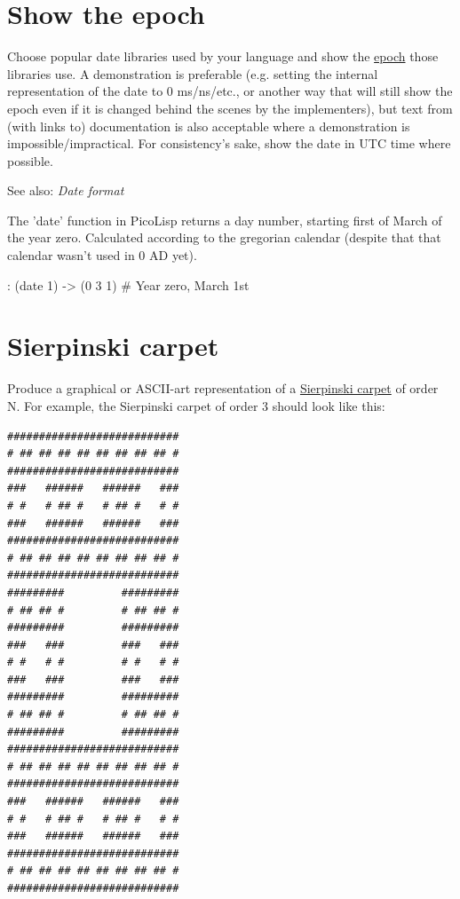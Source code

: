 \pagebreak{}
\section*{Show the epoch}

Choose popular date libraries used by your language and show the
\href{http://en.wikipedia.org/wiki/Epoch\_(reference\_date)\#Computing}{epoch}
those libraries use. A demonstration is preferable (e.g. setting the
internal representation of the date to 0 ms/ns/etc., or another way that
will still show the epoch even if it is changed behind the scenes by the
implementers), but text from (with links to) documentation is also
acceptable where a demonstration is impossible/impractical. For
consistency's sake, show the date in UTC time where possible.

See also: \emph{Date format}


\begin{wideverbatim}

The 'date' function in PicoLisp returns a day number, starting first of March of
the year zero. Calculated according to the gregorian calendar (despite that that
calendar wasn't used in 0 AD yet).

: (date 1)
-> (0 3 1)  # Year zero, March 1st

\end{wideverbatim}

\pagebreak{}
\section*{Sierpinski carpet}

Produce a graphical or ASCII-art representation of a
\href{http://en.wikipedia.org/wiki/Sierpinski\_carpet}{Sierpinski
carpet} of order N. For example, the Sierpinski carpet of order 3 should
look like this:

\begin{verbatim}
###########################
# ## ## ## ## ## ## ## ## #
###########################
###   ######   ######   ###
# #   # ## #   # ## #   # #
###   ######   ######   ###
###########################
# ## ## ## ## ## ## ## ## #
###########################
#########         #########
# ## ## #         # ## ## #
#########         #########
###   ###         ###   ###
# #   # #         # #   # #
###   ###         ###   ###
#########         #########
# ## ## #         # ## ## #
#########         #########
###########################
# ## ## ## ## ## ## ## ## #
###########################
###   ######   ######   ###
# #   # ## #   # ## #   # #
###   ######   ######   ###
###########################
# ## ## ## ## ## ## ## ## #
###########################
\end{verbatim}

